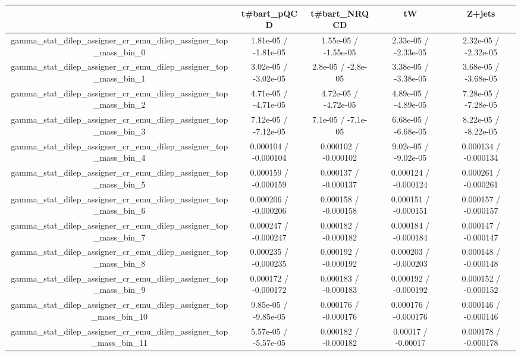\documentclass[10pt]{article}
\begin{document}
\begin{table}[htbp]
\begin{center}
\begin{tabular}{|c|c|c|c|c|}
\hline 
      & t#bar{t}_{pQCD}      & t#bar{t}_{NRQCD}      & tW      & Z+jets \\ 
\hline 
  gamma_stat_dilep_assigner_cr_emu_dilep_assigner_top_mass_bin_0 & 1.81e-05 / -1.81e-05 & 1.55e-05 / -1.55e-05 & 2.33e-05 / -2.33e-05 & 2.32e-05 / -2.32e-05 \\ 
  gamma_stat_dilep_assigner_cr_emu_dilep_assigner_top_mass_bin_1 & 3.02e-05 / -3.02e-05 & 2.8e-05 / -2.8e-05 & 3.38e-05 / -3.38e-05 & 3.68e-05 / -3.68e-05 \\ 
  gamma_stat_dilep_assigner_cr_emu_dilep_assigner_top_mass_bin_2 & 4.71e-05 / -4.71e-05 & 4.72e-05 / -4.72e-05 & 4.89e-05 / -4.89e-05 & 7.28e-05 / -7.28e-05 \\ 
  gamma_stat_dilep_assigner_cr_emu_dilep_assigner_top_mass_bin_3 & 7.12e-05 / -7.12e-05 & 7.1e-05 / -7.1e-05 & 6.68e-05 / -6.68e-05 & 8.22e-05 / -8.22e-05 \\ 
  gamma_stat_dilep_assigner_cr_emu_dilep_assigner_top_mass_bin_4 & 0.000104 / -0.000104 & 0.000102 / -0.000102 & 9.02e-05 / -9.02e-05 & 0.000134 / -0.000134 \\ 
  gamma_stat_dilep_assigner_cr_emu_dilep_assigner_top_mass_bin_5 & 0.000159 / -0.000159 & 0.000137 / -0.000137 & 0.000124 / -0.000124 & 0.000261 / -0.000261 \\ 
  gamma_stat_dilep_assigner_cr_emu_dilep_assigner_top_mass_bin_6 & 0.000206 / -0.000206 & 0.000158 / -0.000158 & 0.000151 / -0.000151 & 0.000157 / -0.000157 \\ 
  gamma_stat_dilep_assigner_cr_emu_dilep_assigner_top_mass_bin_7 & 0.000247 / -0.000247 & 0.000182 / -0.000182 & 0.000184 / -0.000184 & 0.000147 / -0.000147 \\ 
  gamma_stat_dilep_assigner_cr_emu_dilep_assigner_top_mass_bin_8 & 0.000235 / -0.000235 & 0.000192 / -0.000192 & 0.000203 / -0.000203 & 0.000148 / -0.000148 \\ 
  gamma_stat_dilep_assigner_cr_emu_dilep_assigner_top_mass_bin_9 & 0.000172 / -0.000172 & 0.000183 / -0.000183 & 0.000192 / -0.000192 & 0.000152 / -0.000152 \\ 
  gamma_stat_dilep_assigner_cr_emu_dilep_assigner_top_mass_bin_10 & 9.85e-05 / -9.85e-05 & 0.000176 / -0.000176 & 0.000176 / -0.000176 & 0.000146 / -0.000146 \\ 
  gamma_stat_dilep_assigner_cr_emu_dilep_assigner_top_mass_bin_11 & 5.57e-05 / -5.57e-05 & 0.000182 / -0.000182 & 0.00017 / -0.00017 & 0.000178 / -0.000178 \\ 

\end{tabular}
\end{center}
\end{table}
\end{document}
